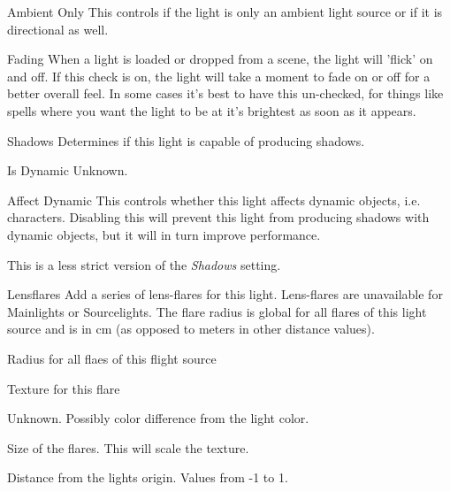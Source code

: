 \begin{propertyAurora}{Ambient Only}
This controls if the light is only an ambient light source or
if it is directional as well.
\end{propertyAurora}

\begin{propertyAurora}{Fading}
When a light is loaded or dropped from a scene, the light will 'flick' on and off. 
If this check is on, the light will take a moment to fade on or off for a better overall feel.
In some cases it’s best to have this un-checked, for things like spells where you want 
the light to be at it’s brightest as soon as it appears.
\end{propertyAurora}

\begin{propertyAurora}{Shadows}
Determines if this light is capable of producing shadows.
\end{propertyAurora}

\begin{propertyAurora}{Is Dynamic}
Unknown.
\end{propertyAurora}

\begin{propertyAurora}{Affect Dynamic}
This controls whether this light affects dynamic objects, i.e. characters.
Disabling this will prevent this light from producing shadows with dynamic
objects, but it will in turn improve performance.

This is a less strict version of the \textit{Shadows} setting.
\end{propertyAurora}

\begin{propertyAurora}{Lensflares}
Add a series of lens-flares for this light. Lens-flares are unavailable for 
Mainlights or Sourcelights. The flare radius is global for all flares of 
this light source and is in cm (as opposed to meters in other distance values).
\begin{description}[labelindent=\parindent,leftmargin=7em,style=nextline]
    \item[Radius] Radius for all flaes of this flight source
    \item[Texture] Texture for this flare
    \item[Colorshift] Unknown. Possibly color difference from the light color.
    \item[Size] Size of the flares. This will scale the texture.
    \item[Position] Distance from the lights origin. Values from -1 to 1.
\end{description}
\end{propertyAurora}

